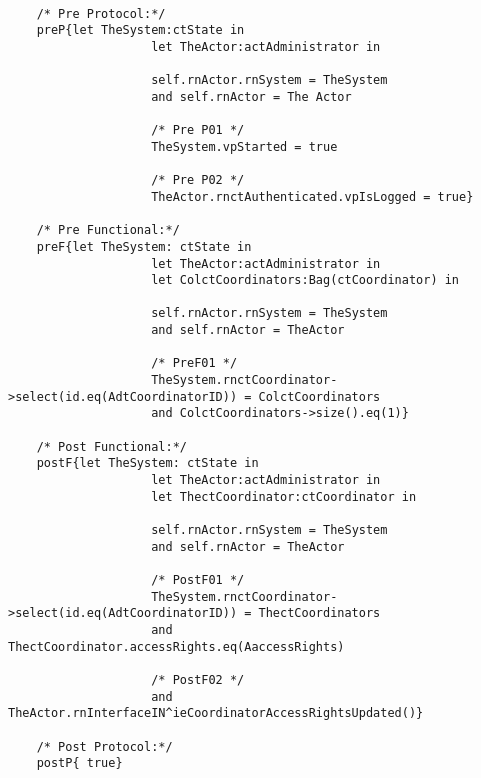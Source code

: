 	\scriptsize
	\vspace{0.5cm}
	\begin{lstlisting}[style=MessirStyle,firstnumber=auto,captionpos=b,caption={\msrmessir (MCL-oriented) specification of the operation \emph{oeUpdateCoordinatorAccessRights}.},label=OM-actAdministrator-oeUpdateCoordinatorAccessRights-MCL-LST]

	/* Pre Protocol:*/ 
	preP{let TheSystem:ctState in
					let TheActor:actAdministrator in
					
					self.rnActor.rnSystem = TheSystem
					and self.rnActor = The Actor
					
					/* Pre P01 */
					TheSystem.vpStarted = true
					
					/* Pre P02 */
					TheActor.rnctAuthenticated.vpIsLogged = true}
	
	/* Pre Functional:*/
	preF{let TheSystem: ctState in
					let TheActor:actAdministrator in
					let ColctCoordinators:Bag(ctCoordinator) in
				
					self.rnActor.rnSystem = TheSystem
					and self.rnActor = TheActor
				
					/* PreF01 */
					TheSystem.rnctCoordinator->select(id.eq(AdtCoordinatorID)) = ColctCoordinators
					and ColctCoordinators->size().eq(1)}
	
	/* Post Functional:*/ 
	postF{let TheSystem: ctState in
					let TheActor:actAdministrator in
					let ThectCoordinator:ctCoordinator in
					
					self.rnActor.rnSystem = TheSystem
					and self.rnActor = TheActor
					
					/* PostF01 */
					TheSystem.rnctCoordinator->select(id.eq(AdtCoordinatorID)) = ThectCoordinators
					and ThectCoordinator.accessRights.eq(AaccessRights)
					
					/* PostF02 */
					and TheActor.rnInterfaceIN^ieCoordinatorAccessRightsUpdated()}
	
	/* Post Protocol:*/ 
	postP{ true}
	
	\end{lstlisting}
	\normalsize 
	
	
	
	





